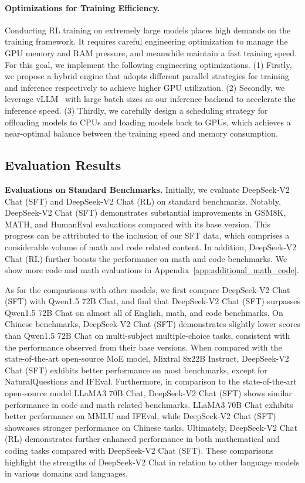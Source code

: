 \paragraph{Optimizations for Training Efficiency.} Conducting RL training on extremely large models places high demands on the training framework. It requires careful engineering optimization to manage the GPU memory and RAM pressure, and meanwhile maintain a fast training speed. For this goal, we implement the following engineering optimizations. (1) Firstly, we propose a hybrid engine that adopts different parallel strategies for training and inference respectively to achieve higher GPU utilization. (2) Secondly, we leverage vLLM~\citep{kwon2023efficient} with large batch sizes as our inference backend to accelerate the inference speed. (3) Thirdly, we carefully design a scheduling strategy for offloading models to CPUs and loading models back to GPUs, which achieves a near-optimal balance between the training speed and memory consumption. 

\subsection{Evaluation Results}

\textbf{Evaluations on Standard Benchmarks.} Initially, we evaluate DeepSeek-V2 Chat (SFT) and DeepSeek-V2 Chat (RL) on standard benchmarks. Notably, DeepSeek-V2 Chat (SFT) demonstrates substantial improvements in GSM8K, MATH, and HumanEval evaluations compared with its base version. This progress can be attributed to the inclusion of our SFT data, which comprises a considerable volume of math and code related content. In addition, DeepSeek-V2 Chat (RL) further boosts the performance on math and code benchmarks. We show more code and math evaluations in Appendix~\ref{app:additional_math_code}. 

As for the comparisons with other models, we first compare DeepSeek-V2 Chat (SFT) with Qwen1.5 72B Chat, and find that DeepSeek-V2 Chat (SFT) surpasses Qwen1.5 72B Chat on almost all of English, math, and code benchmarks. On Chinese benchmarks, DeepSeek-V2 Chat (SFT) demonstrates slightly lower scores than Qwen1.5 72B Chat on multi-subject multiple-choice tasks, consistent with the performance observed from their base versions. When compared with the state-of-the-art open-source MoE model, Mixtral 8x22B Instruct, DeepSeek-V2 Chat (SFT) exhibits better performance on most benchmarks, except for NaturalQuestions and IFEval. Furthermore, in comparison to the state-of-the-art open-source model LLaMA3 70B Chat, DeepSeek-V2 Chat (SFT) shows similar performance in code and math related benchmarks. LLaMA3 70B Chat exhibits better performance on MMLU and IFEval, while DeepSeek-V2 Chat (SFT) showcases stronger performance on Chinese tasks. Ultimately, DeepSeek-V2 Chat (RL) demonstrates further enhanced performance in both mathematical and coding tasks compared with DeepSeek-V2 Chat (SFT). These comparisons highlight the strengths of DeepSeek-V2 Chat in relation to other language models in various domains and languages.

